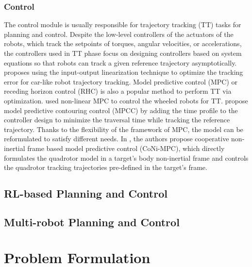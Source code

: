 \documentclass[letterpaper,journal,twoside]{IEEEtran}
\begin{document}
\subsubsection{Control}
The control module is usually responsible for trajectory 
tracking (TT) tasks for planning and control.
Despite the low-level controllers of the actuators of the 
robots, which track the setpoints of torques, angular 
velocities, or accelerations, the controllers used in TT
phase focus on designing controllers based on system
equations so that robots can track a given reference 
trajectory asymptotically. 
\cite{majd2019stable} proposes using the input-output 
linearization technique to optimize the tracking error for
car-like robot trajectory tracking.
Model predictive control (MPC) or receding horizon control (RHC)
is also a popular method to perform TT via optimization.
\cite{kunhe2005mobile} used non-linear MPC to control the 
wheeled robots for TT.
\cite{romero2022model,ji2021cmpcc} propose model predictive
contouring control (MPCC) by adding the time profile to the 
controller design to minimize the traversal time while tracking
the reference trajectory.
Thanks to the flexibility of the framework of MPC, the model 
can be reformulated to satisfy different needs. 
In \cite{zhang2023coni}, the authors propose cooperative 
non-inertial frame based model predictive control (CoNi-MPC), 
which directly formulates the quadrotor model in a target's 
body non-inertial frame and controls the quadrotor tracking 
trajectories pre-defined in the target's frame.

\subsection{RL-based Planning and Control}

\subsection{Multi-robot Planning and Control}

\section{Problem Formulation}



\end{document}
